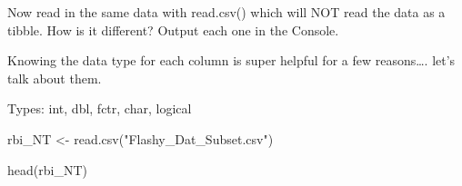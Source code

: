 \documentclass[
]{book}
\newenvironment{Shaded}{\begin{snugshade}}{\end{snugshade}}
\newcommand{\FunctionTok}[1]{\textcolor[rgb]{0.00,0.00,0.00}{#1}}
\newcommand{\NormalTok}[1]{#1}
\newcommand{\OtherTok}[1]{\textcolor[rgb]{0.56,0.35,0.01}{#1}}
\newcommand{\StringTok}[1]{\textcolor[rgb]{0.31,0.60,0.02}{#1}}
\begin{document}
Now read in the same data with read.csv() which will NOT read the data as a tibble. How is it different? Output each one in the Console.

Knowing the data type for each column is super helpful for a few reasons\ldots. let's talk about them.

Types: int, dbl, fctr, char, logical

\begin{Shaded}
\begin{Highlighting}[]
\NormalTok{rbi\_NT }\OtherTok{\textless{}{-}} \FunctionTok{read.csv}\NormalTok{(}\StringTok{"Flashy\_Dat\_Subset.csv"}\NormalTok{)}

\FunctionTok{head}\NormalTok{(rbi\_NT)}
\end{Highlighting}
\end{Shaded}
\end{document}
